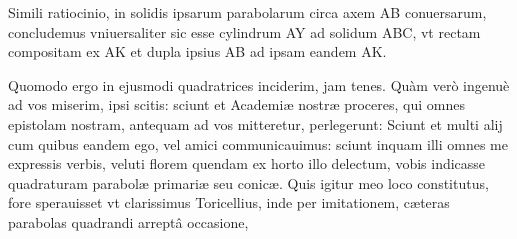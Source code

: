 \documentclass[11pt,a4paper]{article}
\begin{document}
Simili ratiocinio, in solidis ipsarum parabolarum circa axem AB conuersarum, concludemus vniuersaliter sic esse cylindrum AY ad solidum ABC, vt rectam compositam ex AK et dupla ipsius AB ad ipsam eandem AK.

Quomodo ergo in ejusmodi quadratrices inciderim, jam tenes. Quàm verò ingenuè ad vos miserim, ipsi scitis: sciunt et Academiæ nostræ proceres, qui omnes epistolam nostram, antequam ad vos mitteretur, perlegerunt: Sciunt et multi alij cum quibus eandem ego, vel amici communicauimus: sciunt inquam illi omnes me expressis verbis, veluti florem quendam ex horto illo delectum, vobis indicasse quadraturam parabolæ primariæ seu conicæ. Quis igitur meo loco constitutus, fore sperauisset vt clarissimus Toricellius, inde per imitationem, cæteras parabolas quadrandi arreptâ occasione,

\end{document}
